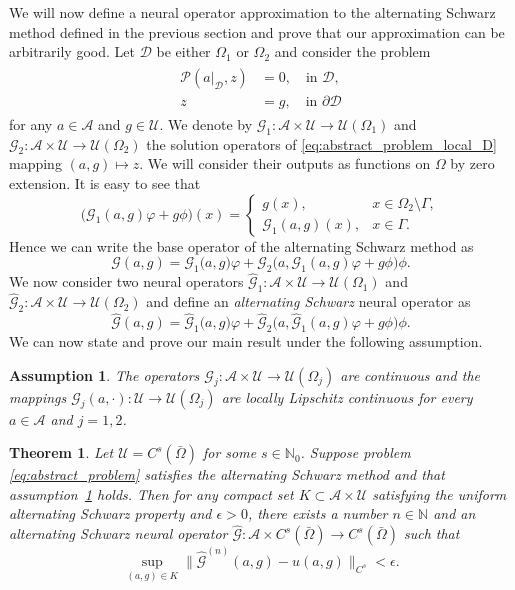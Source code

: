 \documentclass[preprint,11pt]{elsarticle}
\newtheorem{theorem}{Theorem}
\theoremstyle{plain}
\newtheorem{assumption}{Assumption}
\newcommand{\N}{\mathbb{N}}
\newcommand{\G}{\mathcal{G}}
\newcommand{\A}{\mathcal{A}}
\newcommand{\U}{\mathcal{U}}
\newcommand{\D}{\mathcal{D}}
\begin{document}
We will now define a neural operator approximation to the alternating Schwarz method defined in the previous section and prove that our approximation can be arbitrarily good. Let $\D$ be either $\Omega_1$ or $\Omega_2$ and consider the problem 
\begin{align}
\label{eq:abstract_problem_local_D}
    \begin{split}
    \mathcal{P}(a|_{\D},z) &= 0, \quad \text{in } \D, \\
    z &= g, \quad \text{in } \partial \D
    \end{split}
\end{align}
for any $a \in \A$ and $g \in \U$. We denote by $\G_1 : \A \times \U \to \U(\Omega_1)$ and $\G_2 : \A \times \U \to \U(\Omega_2)$ the solution operators of \eqref{eq:abstract_problem_local_D} mapping $(a,g) \mapsto z$. We will consider their outputs as functions on $\Omega$ by zero extension. It is easy to see that
\begin{equation}
    \big ( \G_1 (a, g) \varphi + g \phi \big )(x) = \begin{cases}
    g(x), & x \in \Omega_2 \setminus \Gamma, \\
    \G_1 (a, g)(x), & x \in \Gamma. \end{cases}
\end{equation}
Hence we can write the base operator of the alternating Schwarz method as
\begin{equation}
\G(a,g) = \G_1 \big ( a,g \big ) \varphi + \G_2 \big (a, \G_1 (a,g) \varphi + g \phi \big) \phi.
\end{equation}
We now consider two neural operators $\hat{\G}_1 : \A \times \U \to \U(\Omega_1)$ and $\hat{\G}_2 : \A \times \U \to \U(\Omega_2)$
and define an \textit{alternating Schwarz} neural operator as 
\begin{equation}
\hat{\G}(a,g) = \hat{\G}_1 \big ( a,g \big ) \varphi + \hat{\G}_2 \big (a, \hat{\G}_1 (a,g) \varphi + g \phi \big) \phi.
\end{equation}
We can now state and prove our main result under the following assumption.
\begin{assumption}
    \label{asump:continuity}
    The operators $\G_j: \A \times \U \to \U(\Omega_j)$ are continuous and the mappings $\G_j(a,\cdot) : \U \to \U(\Omega_j)$ are locally Lipschitz continuous for every $a \in \A$ and $j=1,2$.  
\end{assumption}

\begin{theorem}
    \label{thm:main_approximation}
    Let $\U = C^s (\bar{\Omega})$ for some $s \in \N_0$. Suppose problem \eqref{eq:abstract_problem} satisfies the alternating Schwarz method and that assumption~\ref{asump:continuity} holds. Then for any compact set $K \subset \A \times \U$ satisfying the uniform alternating Schwarz property and $\epsilon > 0$, there exists a number $n \in \N$ and an alternating Schwarz neural operator $\hat{\G} : \A \times C^s (\bar{\Omega}) \to C^s (\bar{\Omega})$ such that
    \begin{equation}
        \sup_{(a,g) \in K} \|\hat{\G}^{(n)}(a,g) - u(a,g) \|_{C^s} < \epsilon.
    \end{equation}
\end{theorem}
\end{document}
